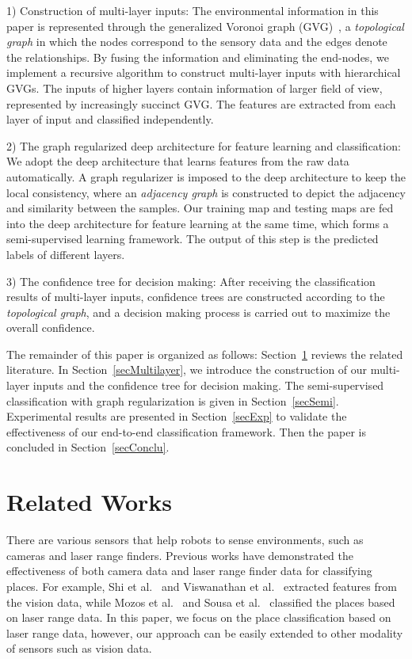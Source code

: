 \documentclass[letterpaper, 10 pt, conference]{ieeeconf}  %
\begin{document}
1) Construction of multi-layer inputs: The environmental information in this paper is represented through the generalized Voronoi graph (GVG)~\cite{choset1995sensor}, a \emph{topological graph} in which the nodes correspond to the sensory data and the edges denote the relationships. By fusing the information and eliminating the end-nodes, we implement a recursive algorithm to construct multi-layer inputs with hierarchical GVGs. The inputs of higher layers contain information of larger field of view, represented by increasingly succinct GVG. The features are extracted from each layer of input and classified independently.

2) The graph regularized deep architecture for feature learning and classification: We adopt the deep architecture that learns features from the raw data automatically. A graph regularizer is imposed to the deep architecture to keep the local consistency, where an \emph{adjacency graph} is constructed to depict the adjacency and similarity between the samples. Our training map and testing maps are fed into the deep architecture for feature learning at the same time, which forms a semi-supervised learning framework. The output of this step is the predicted labels of different layers.

3) The confidence tree for decision making: After receiving the classification results of multi-layer inputs, confidence trees are constructed according to the \emph{topological graph}, and a decision making process is carried out to maximize the overall confidence.



The remainder of this paper is organized as follows: Section~\ref{secRelated} reviews the related literature. In Section~\ref{secMultilayer}, we introduce the construction of our multi-layer inputs and the confidence tree for decision making. The semi-supervised classification with graph regularization is given in Section~\ref{secSemi}. Experimental results are presented in Section~\ref{secExp} to validate the effectiveness of our end-to-end classification framework. Then the paper is concluded in Section~\ref{secConclu}.

\section{Related Works} \label{secRelated}

There are various sensors that help robots to sense environments, such as cameras and laser range finders. Previous works have demonstrated the effectiveness of both camera data and laser range finder data for classifying places. For example, Shi et al.~\cite{shi2006investigating} and Viswanathan et al.~\cite{viswanathan2009automated} extracted features from the vision data, while Mozos et al.~\cite{mozos2005supervised} and Sousa et al.~\cite{sousa2007real} classified the places based on laser range data. In this paper, we focus on the place classification based on laser range data, however, our approach can be easily extended to other modality of sensors such as vision data.
\end{document}

